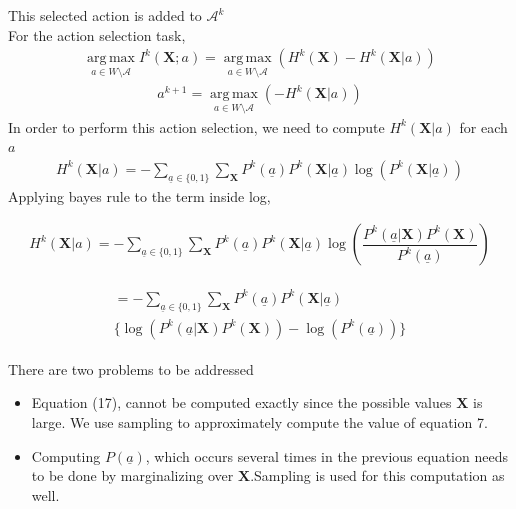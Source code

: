 \documentclass[10pt,twocolumn,letterpaper]{article}
\begin{document}
This selected action is added to $\mathcal{A}^{k}$\\
For the action selection task,
\begin{align}
\operatorname*{arg\,max}_{a\in W \setminus{\mathcal{A}}}I^{k}(\textbf{X}; a) =\operatorname*{arg\,max}_{a\in W \setminus{\mathcal{A}}} (H^{k}(\textbf{X}) - H^{k}(\textbf{X}|a))
\end{align}
\begin{align}
a^{k+1} =\operatorname*{arg\,max}_{a\in W \setminus{\mathcal{A}}} (- H^{k}(\textbf{X}|a))
\end{align}
In order to perform this action selection, we need to compute $H^{k}(\textbf{X}|a)$ for each $a$
\begin{align}
H^{k}(\textbf{X}| a) = -\sum_{\underline{a}\in\lbrace 0 ,1 \rbrace} \sum_{\textbf{X}} P^{k}(\underline{a})P^{k}(\textbf{X}| \underline{a}) \log(P^{k}(\textbf{X}| \underline{a}))
\end{align}
Applying bayes rule to the term inside log,

\begin{align}
H^{k}(\textbf{X}| a)= -\sum_{\underline{a}\in\lbrace 0 ,1 \rbrace} \sum_{\textbf{X}} P^{k}( \underline{a})P^{k}(\textbf{X}| \underline{a}) \log(\dfrac{P^{k}( \underline{a}|\textbf{X})P^{k}(\textbf{X})}{P^{k}( \underline{a})})
\end{align}

\begin{align}
\begin{split}
 = -\sum_{\underline{a}\in\lbrace 0 ,1 \rbrace} \sum_{\textbf{X}} P^{k}( \underline{a})  P^{k}(\textbf{X}| \underline{a}) \\ \Big\lbrace\log(P^{k}( \underline{a}|\textbf{X})P^{k}(\textbf{X})) - \log(P^{k}( \underline{a}))\Big\rbrace
\end{split}
\end{align}

There are two problems to be addressed
\begin{itemize}

\item{Equation (17), cannot be computed exactly since the possible values $\textbf{X}$ is large. We use sampling to approximately compute the value of equation 7.}

\item{Computing $P( \underline{a})$, which occurs several times in the previous equation needs to be done by marginalizing over $\textbf{X}$.Sampling is used for this computation as well.} 
\end{itemize}
\end{document}
